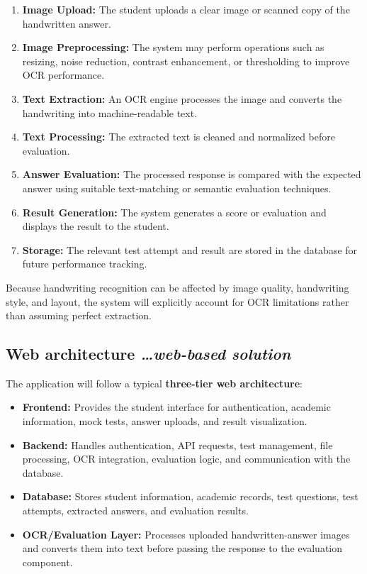 \documentclass[11pt,a4paper]{article}
\newcommand{\BvrHint}[1]{%
  {\normalfont\normalsize\itshape\hfill #1}}
\begin{document}
\begin{enumerate}
    \item \textbf{Image Upload:} The student uploads a clear image or scanned copy of the handwritten answer.

    \item \textbf{Image Preprocessing:} The system may perform operations such as resizing, noise reduction, contrast enhancement, or thresholding to improve OCR performance.

    \item \textbf{Text Extraction:} An OCR engine processes the image and converts the handwriting into machine-readable text.

    \item \textbf{Text Processing:} The extracted text is cleaned and normalized before evaluation.

    \item \textbf{Answer Evaluation:} The processed response is compared with the expected answer using suitable text-matching or semantic evaluation techniques.

    \item \textbf{Result Generation:} The system generates a score or evaluation and displays the result to the student.

    \item \textbf{Storage:} The relevant test attempt and result are stored in the database for future performance tracking.
\end{enumerate}

Because handwriting recognition can be affected by image quality, handwriting style, and layout, the system will explicitly account for OCR limitations rather than assuming perfect extraction.

\subsection{Web architecture %
\BvrHint{\ldots web-based solution}}
The application will follow a typical \textbf{three-tier web architecture}:

\begin{itemize}
    \item \textbf{Frontend:} Provides the student interface for authentication, academic information, mock tests, answer uploads, and result visualization.

    \item \textbf{Backend:} Handles authentication, API requests, test management, file processing, OCR integration, evaluation logic, and communication with the database.

    \item \textbf{Database:} Stores student information, academic records, test questions, test attempts, extracted answers, and evaluation results.

    \item \textbf{OCR/Evaluation Layer:} Processes uploaded handwritten-answer images and converts them into text before passing the response to the evaluation component.
\end{itemize}
\end{document}
